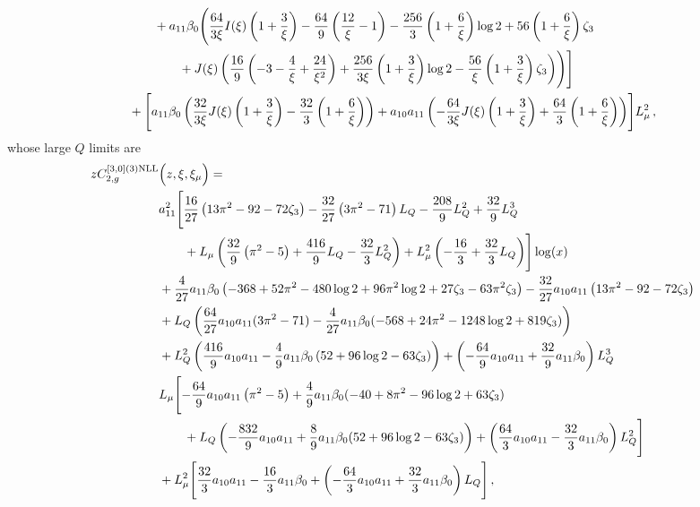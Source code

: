\documentclass[a4paper]{article}
\begin{document}
\begin{align}
		&\qquad + a_{11} \beta_0 \Biggl(\frac{64}{3\xi} I(\xi) \left(1 + \frac{3}{\xi}\right) - \frac{64}{9} \left(\frac{12}{\xi} - 1\right) - \frac{256}{3} \left(1 + \frac{6}{\xi}\right) \log 2 + 56 \left(1 + \frac{6}{\xi}\right) \zeta_3 \notag\\
		& \qquad \qquad + J(\xi) \left( \frac{16}{9} \left(-3 - \frac{4}{\xi} + \frac{24}{\xi^2}\right) + \frac{256}{3\xi} \left(1 + \frac{3}{\xi}\right) \log 2 - \frac{56}{\xi}\left(1 + \frac{3}{\xi}\right) \zeta_3 \right)\Biggr)\Biggr]\notag \\
		& + \Biggl[a_{11} \beta_0 \left( \frac{32}{3\xi} J(\xi) \left(1 + \frac{3}{\xi}\right) - \frac{32}{3} \left(1 + \frac{6}{\xi}\right) \right)  + a_{10} a_{11} \left(-\frac{64}{3\xi} J(\xi) \left(1 + \frac{3}{\xi}\right) + \frac{64}{3} \left(1 + \frac{6}{\xi}\right)\right)\Biggr] L_\mu^2\,,
	\end{align}
	\endgroup
whose large $Q$ limits are
\begingroup
\allowdisplaybreaks
\begin{align}
		z C_{2,g}^{[3, 0](3) \rm NLL}&\Bigl(z,\xi,\xi_\mu\Bigr)= \notag\\
		& a_{11}^2 \Biggl[\frac{16}{27} \left(13 \pi^2 -92- 72 \zeta_3\right) -\frac{32}{27} \left(3 \pi^2 - 71\right) L_Q - \frac{208}{9} L_Q^2 + \frac{32}{9} L_Q^3 \notag \\
		& \qquad + L_\mu \left(\frac{32}{9} \left( \pi^2 - 5\right) + \frac{416}{9} L_Q - \frac{32}{3} L_Q^2 \right) + L_\mu^2 \left(-\frac{16}{3} + \frac{32}{3} L_Q\right)\Biggr] \log(x) \notag\\
		& + \frac{4}{27} a_{11} \beta_0 \left(-368 + 52 \pi^2 - 480 \log 2 + 96 \pi^2 \log 2 + 27 \zeta_3 - 63 \pi^2 \zeta_3\right) - \frac{32}{27} a_{10} a_{11} \left(13 \pi^2 -92- 72 \zeta_3\right) \notag\\
		& + L_Q \left( \frac{64}{27} a_{10} a_{11} (3 \pi^2 - 71) - \frac{4}{27} a_{11} \beta_0 (-568 + 24 \pi^2 - 1248 \log 2 + 819 \zeta_3) \right) \notag\\
		& + L_Q^2 \left(\frac{416}{9} a_{10} a_{11} - \frac{4}{9} a_{11} \beta_0 \left(52 + 96 \log 2 - 63 \zeta_3 \right)\right) + \left(- \frac{64}{9} a_{10} a_{11} + \frac{32}{9} a_{11} \beta_0 \right) L_Q^3 \notag\\
		& L_\mu \Biggl[-\frac{64}{9} a_{10} a_{11} \left( \pi^2 - 5\right) + \frac{4}{9} a_{11} \beta_0 (-40 + 8 \pi^2 - 96 \log 2 + 63 \zeta_3)\notag \\
		& \qquad + L_Q \left(-\frac{832}{9} a_{10} a_{11} + \frac{8}{9} a_{11} \beta_0 (52 + 96 \log 2 - 63 \zeta_3)\right) + \left(\frac{64}{3} a_{10} a_{11} - \frac{32}{3} a_{11} \beta_0 \right) L_Q^2 \Biggr]\notag \\
		& + L_\mu^2 \Biggl[\frac{32}{3} a_{10} a_{11} - \frac{16}{3} a_{11} \beta_0 + \left(-\frac{64}{3} a_{10} a_{11} + \frac{32}{3} a_{11} \beta_0 \right) L_Q \Biggr]\,,
	\end{align}
\end{document}
